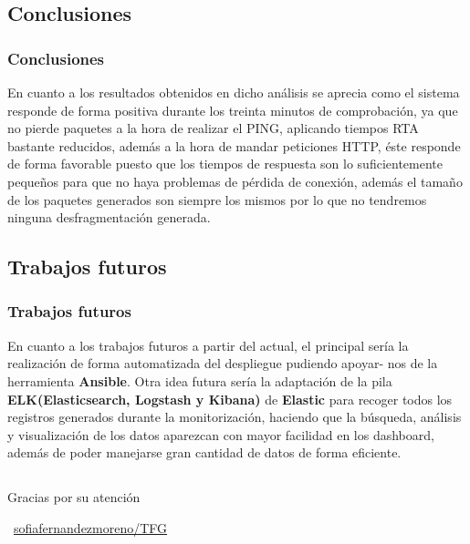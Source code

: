 \documentclass{beamer}
\theoremstyle{plain}
\theoremstyle{definition}
\theoremstyle{plain}
\theoremstyle{definition}
\theoremstyle{remark}
\theoremstyle{definition}
\begin{document}
\subsection{Conclusiones}
\begin{frame}
	\frametitle{Conclusiones}
	En cuanto a los resultados obtenidos en dicho análisis se aprecia
	como el sistema responde de forma positiva durante los treinta minutos de
	comprobación, ya que no pierde paquetes a la hora de realizar el PING,
	aplicando tiempos RTA bastante reducidos, además a la hora de mandar
	peticiones HTTP, éste responde de forma favorable puesto que los tiempos
	de respuesta son lo suficientemente pequeños para que no haya problemas
	de pérdida de conexión, además el tamaño de los paquetes generados son
	siempre los mismos por lo que no tendremos ninguna desfragmentación generada.
	
\end{frame}
\subsection{Trabajos futuros}
\begin{frame}
	\frametitle{Trabajos futuros}
En cuanto a los trabajos futuros a partir del actual, el principal
sería la realización de forma automatizada del despliegue pudiendo apoyar-
nos de la herramienta \textbf{Ansible}. Otra idea futura sería la adaptación de la
pila \textbf{ELK(Elasticsearch, Logstash y Kibana)} de \textbf{Elastic} para recoger todos
los registros generados durante la monitorización, haciendo que la búsqueda, análisis y visualización de los datos aparezcan con mayor facilidad en
los dashboard, además de poder manejarse gran cantidad de datos de forma
eficiente.	
\end{frame}
\subsection{}
\begin{frame}{}{}
	\Huge{\centerline{Gracias por su atención}}
	\centerline{\Huge{\raisebox{-.25\height}\faGithub}~\large{\href{https://github.com/sofiafernandezmoreno/TFG}{\alert{sofiafernandezmoreno/TFG}}}}

\end{frame}
\end{document}
